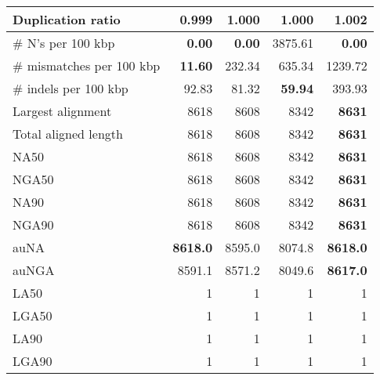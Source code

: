 \documentclass[12pt,a4paper]{article}
\begin{document}
\begin{table}[ht]
\begin{center}
\begin{tabular}{|l*{4}{|r}|}
Duplication ratio & {\bf 0.999} & 1.000 & 1.000 & 1.002 \\ \hline
\# N's per 100 kbp & {\bf 0.00} & {\bf 0.00} & 3875.61 & {\bf 0.00} \\ \hline
\# mismatches per 100 kbp & {\bf 11.60} & 232.34 & 635.34 & 1239.72 \\ \hline
\# indels per 100 kbp & 92.83 & 81.32 & {\bf 59.94} & 393.93 \\ \hline
Largest alignment & 8618 & 8608 & 8342 & {\bf 8631} \\ \hline
Total aligned length & 8618 & 8608 & 8342 & {\bf 8631} \\ \hline
NA50 & 8618 & 8608 & 8342 & {\bf 8631} \\ \hline
NGA50 & 8618 & 8608 & 8342 & {\bf 8631} \\ \hline
NA90 & 8618 & 8608 & 8342 & {\bf 8631} \\ \hline
NGA90 & 8618 & 8608 & 8342 & {\bf 8631} \\ \hline
auNA & {\bf 8618.0} & 8595.0 & 8074.8 & {\bf 8618.0} \\ \hline
auNGA & 8591.1 & 8571.2 & 8049.6 & {\bf 8617.0} \\ \hline
LA50 & 1 & 1 & 1 & 1 \\ \hline
LGA50 & 1 & 1 & 1 & 1 \\ \hline
LA90 & 1 & 1 & 1 & 1 \\ \hline
LGA90 & 1 & 1 & 1 & 1 \\ \hline
\end{tabular}
\end{center}
\end{table}
\end{document}
